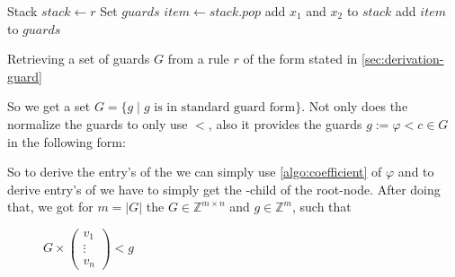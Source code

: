 \begin{algorithm}
	\begin{algorithmic}[1]
		 
			\State Stack $stack \gets r$
			\State Set $guards$
				\State $item \gets stack.pop$
					\State add $x_1$ and $x_2$ to $stack$
				\Else
					\State add $item$ to $guards$
				\EndIf				
			\EndWhile			
		\EndFunction		
	\end{algorithmic}
	\caption{Retrieving a set of guards $G$ from a rule $r$ of the form stated in \autoref{sec:derivation-guard}}
	\label{algo:decat-guards}
\end{algorithm}

So we get a set $G=\{ g \mid g \text{ is in standard guard form}\}$. Not only does the \seg normalize the guards to only use $<$, also it provides the guards $g:= \varphi < c \in G$ in the following form:\newline
\begin{figure}[H]
	\centering
\end{figure}

So to derive the entry's of the \guardmatrix we can simply use \autoref{algo:coefficient} of $\varphi$ and to derive entry's of \guardconstants we have to simply get the -child of the root-node.
After doing that, we got for $m=|G|$ the \guardmatrix $G \in \mathbb{Z}^{m\times n}$ and \guardconstants $g \in \mathbb{Z}^m$, such that
\begin{figure}[H]
	\centering
	$G \times \begin{pmatrix} v_1 \\ \vdots \\ v_n \end{pmatrix} < g$
\end{figure}
